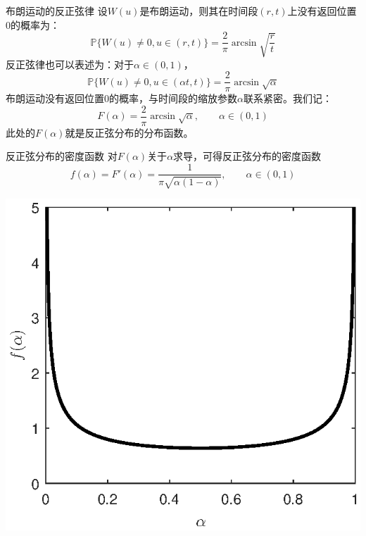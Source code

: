 \documentclass[t]{beamer}
\renewcommand{\Pr}{\mathbb{P}}
\begin{document}
\begin{frame}{布朗运动的反正弦律}
  设$W(u)$是布朗运动，则其在时间段$(r,t)$上没有返回位置0的概率为：
\[\Pr\{W(u)\ne 0, u\in(r,t)\}=\frac{2}{\pi} \arcsin \sqrt{\frac{r}{t}} \]
反正弦律也可以表述为：对于$\alpha\in (0,1)$，
\begin{equation*}
\Pr\{W(u)\ne 0, u\in(\alpha t,t)\}=\frac{2}{\pi} \arcsin \sqrt{\alpha}
\end{equation*}
    布朗运动没有返回位置0的概率，与时间段的缩放参数$\alpha$联系紧密。我们记：
    \begin{equation*}
    F(\alpha)=\frac{2}{\pi} \arcsin \sqrt{\alpha} ,\qquad \alpha\in (0,1)
    \end{equation*}
    此处的$F(\alpha)$就是反正弦分布的分布函数。
\end{frame}



\begin{frame}{反正弦分布的密度函数}
  对$F(\alpha)$关于$\alpha$求导，可得反正弦分布的密度函数
  \begin{equation*}
    f(\alpha)=F'(\alpha)=\frac{1}{\pi\sqrt{\alpha(1-\alpha)}},\qquad \alpha\in (0,1)
    \end{equation*}
  \begin{center}
\includegraphics[scale=.63]{fig/asin.eps}
\end{center}
\end{frame}
\end{document}
